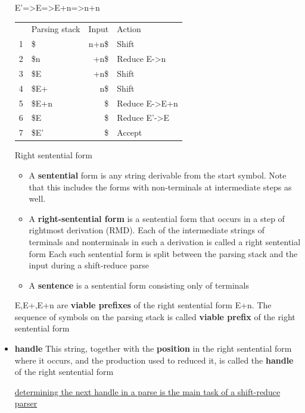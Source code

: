 \documentclass[11pt]{article}
\begin{document}
\begin{itemize}
E'=>E=>E+n=>n+n
\begin{center}
\begin{tabular}{rlrl}
 & Parsing stack & Input & Action\\
1 & \$ & n+n\$ & Shift\\
2 & \$n & +n\$ & Reduce  E->n\\
3 & \$E & +n\$ & Shift\\
4 & \$E+ & n\$ & Shift\\
5 & \$E+n & \$ & Reduce E->E+n\\
6 & \$E & \$ & Reduce E'->E\\
7 & \$E' & \$ & Accept\\
\end{tabular}
\end{center}
\item[{Right sentential form}] \begin{itemize}
\item A \textbf{sentential} form is any string derivable from the start symbol. Note
that this includes the forms with non-terminals at intermediate steps as
well.
\item A \textbf{right-sentential form} is a sentential form that occurs in a step of
rightmost derivation (RMD).
Each of the intermediate strings of terminals and nonterminals in such
a derivation is called a right sentential form
Each such sentential form is split between the parsing stack and the input
during a shift-reduce parse
\item A \textbf{sentence} is a sentential form consisting only of terminals
\end{itemize}

E,E+,E+n are \textbf{viable prefixes} of the right sentential form E+n.
The sequence of symbols on the parsing stack is called \textbf{viable prefix} of the
right sentential form
\item \textbf{handle}
This string, together with the \textbf{position} in the right sentential form where it
occurs, and the production used to reduced it, is called the \textbf{handle} of the right
sentential form

\uline{determining the next handle in a parse is the main task of a shift-reduce parser}
\end{itemize}
\end{document}
